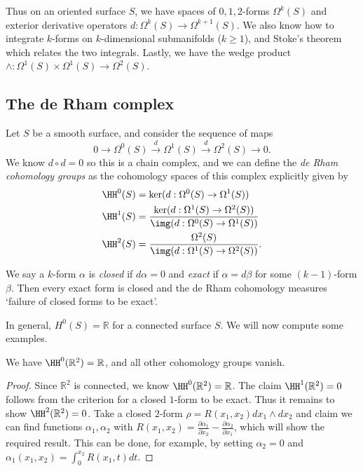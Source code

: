 Thus on an oriented surface \(S\), we have spaces of \(0,1,2\)-forms
\(\Omega^k(S)\) and exterior derivative operators \(d:\Omega^k(S)\to
\Omega^{k+1}(S)\). We also know how to integrate \(k\)-forms on
\(k\)-dimensional submanifolds (\(k\geq 1\)), and Stoke's theorem which
relates the two integrals. Lastly, we have the wedge product
\(\wedge:\Omega^1(S)\times \Omega^1(S)\to \Omega^2(S)\).

\subsection{The de Rham complex}
Let \(S\) be a smooth surface, and consider the sequence of maps
\[
    0\to \Omega^0(S)\xrightarrow{d} \Omega^1(S)\xrightarrow{d} \Omega^2(S)\to 0.
\]
We know \(d\circ d=0\) so this is a chain complex, and we can define the \textit{de Rham cohomology groups} as the cohomology spaces of this complex explicitly given by
\begin{align*}
    \HH^0(S) &= \ker(d:\Omega^0(S)\to \Omega^1(S)) \\
    \HH^1(S) &= \frac{\ker(d:\Omega^1(S)\to \Omega^2(S))}{\img(d:\Omega^0(S)\to
    \Omega^1(S))}\\
    \HH^2(S) &= \frac{\Omega^2(S)}{\img(d:\Omega^1(S)\to \Omega^2(S))}.
\end{align*}

We say a \(k\)-form \(\alpha\) is \textit{closed} if \(d\alpha=0\) and
\textit{exact} if \(\alpha=d\beta\) for some \((k-1)\)-form \(\beta\). Then every
exact form is closed and the de Rham cohomology measures `failure of closed
forms to be exact'.

In general, \(H^0(S)=\mathbb{R}\) for a connected surface \(S\). We will now
compute some examples.

\begin{lemma}
    We have \(\HH^0(\mathbb{R}^2)=\mathbb{R}\), and all other cohomology
    groups vanish.

    \begin{proof}
        Since \(\mathbb{R}^2\) is connected, we know
        \(\HH^0(\mathbb{R}^2)=\mathbb{R}\). The claim \(\HH^1(\mathbb{R}^2)=0\)
        follows from the criterion for a closed \(1\)-form to be exact. Thus it
        remains to show \(\HH^2(\mathbb{R}^2)=0\). Take a closed \(2\)-form
        \(\rho=R(x_1,x_2)dx_1\wedge dx_2\) and claim we can find functions
        \(\alpha_1,\alpha_2\) with \(R(x_1,x_2)=\frac{\partial
        \alpha_1}{\partial x_2}-\frac{\partial \alpha_2}{\partial x_1}\), which
        will show the required result. This can be done, for example, by setting
        \(\alpha_2=0\) and \(\alpha_1(x_1,x_2)=\int_0^{x_2} R(x_1,t)dt\).
    \end{proof}
\end{lemma}


